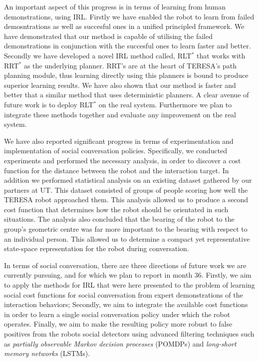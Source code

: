 \documentclass[a4paper,11pt]{report}
\begin{document}
 An important aspect of this progress is in terms of learning from human demonstrations, using IRL. Firstly we have enabled the robot to learn from failed demosntrations as well as succesful ones in a unified principled framework. We have demonstrated that our method is capable of utilising the failed demonstrations in conjunction with the succesful ones to learn faster and better. Secondly we have developed a novel IRL method called, RLT$^*$ that works with RRT$^*$ as the underlying planner. RRT's are at the heart of TERESA's path planning module, thus learning directly using this planners is bound to produce superior learning results. We have also shown that our method is faster and better that a similar method that uses deterministic planners. A clear avenue of future work is to deploy RLT$^*$ on the real system. Furthermore we plan to integrate these methods together and evaluate any improvement on the real system.

 We have also reported significant progress in terms of experimentation and implementation of social conversation policies. Specifically, we conducted experiments and performed the necessary analysis, in order to discover a cost function for the distance between the robot and the interaction target. In addition we performed statistical analysis on an existing dataset gathered by our partners at UT. This dataset consisted of groups of people scoring how well the TERESA robot approached them. This analysis allowed us to produce a second cost function that determines how the robot should be orientated in such situations. The analysis also concluded that the bearing of the robot to the group's geometric centre was far more important to the bearing with respect to an individual person. This allowed us to determine a compact yet representative state-space representation for the robot during conversation. 

In terms of social conversation, there are three directions of future work we are currently pursuing, and for which we plan to report in month 36. Firstly, we aim to apply the methods for IRL that were here presented to the problem of learning social cost functions for social conversation from expert demonstrations of the interaction behaviors; Secondly, we aim to integrate the available cost functions in order to learn a single social conversation policy under which the robot operates. Finally, we aim to make the resulting policy more robust to false positives from the robots social detectors using advanced filtering techniques such as \emph{partially observable Markov decision processes} (POMDPs) and \emph{long-short memory networks} (LSTMs).



\end{document}
